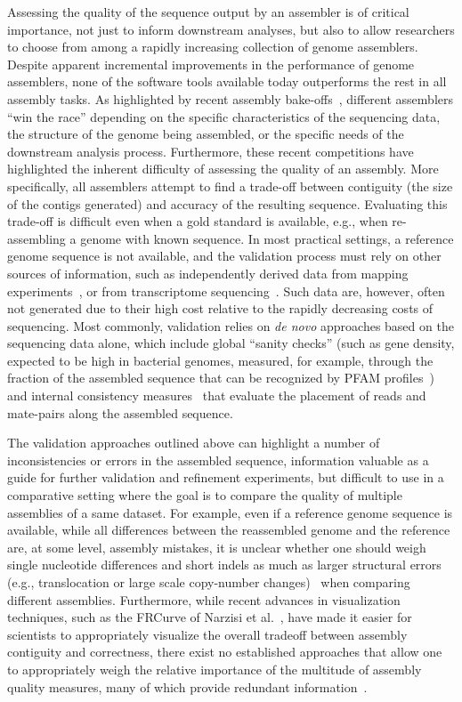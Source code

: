 \documentclass[12pt,\mydriver]{thesis}
\begin{document}
Assessing the quality of the sequence output by an assembler is
of critical importance, not just to inform downstream analyses, but
also to allow researchers to choose from among a rapidly increasing
collection of genome assemblers. Despite apparent incremental
improvements in the performance of genome assemblers, none of the
software tools available today outperforms the rest in all assembly
tasks. As highlighted by recent assembly
bake-offs~\cite{earl2011assemblathon,salzberg2011gage}, different
assemblers ``win the race'' depending on the specific characteristics
of the sequencing data, the structure of the genome being assembled,
or the specific needs of the downstream analysis process.
Furthermore, these recent competitions have highlighted the inherent
difficulty of assessing the quality of an assembly.  More
specifically, all assemblers attempt to find a trade-off between
contiguity (the size of the contigs generated) and accuracy of the
resulting sequence.  Evaluating this trade-off is difficult even when
a gold standard is available, e.g., when re-assembling a genome with
known sequence.  In most practical settings, a reference genome
sequence is not available, and the validation process must rely on
other sources of information, such as independently derived data from
mapping experiments~\cite{zhou2007validation}, or from transcriptome
sequencing~\cite{adamidi2011novo}. Such data are, however, often not
generated due to their high cost relative to the rapidly decreasing
costs of sequencing. Most commonly, validation relies on \emph{de
  novo} approaches based on the sequencing data alone, which include
global ``sanity checks'' (such as gene density, expected to be high in
bacterial genomes, measured, for example, through the fraction of the
assembled sequence that can be recognized by PFAM
profiles~\cite{genovo2011}) and internal consistency
measures~\cite{amosvalidate2008} that evaluate the placement of reads
and mate-pairs along the assembled sequence.

The validation approaches outlined above can highlight a number of
inconsistencies or errors in the assembled sequence, information
valuable as a guide for further validation and refinement experiments,
but difficult to use in a comparative setting where the goal is to
compare the quality of multiple assemblies of a same dataset.  For
example, even if a reference genome sequence is available, while all
differences between the reassembled genome and the reference are, at
some level, assembly mistakes, it is unclear whether one should weigh
single nucleotide differences and short indels as much as larger
structural errors (e.g., translocation or large scale copy-number
changes)~\cite{earl2011assemblathon} when comparing different
assemblies.  Furthermore, while recent advances in visualization
techniques, such as the FRCurve of Narzisi et
al.~\cite{FRC2011,vezzi2012feature}, have made it easier for
scientists to appropriately visualize the overall tradeoff between
assembly contiguity and correctness, there exist no established
approaches that allow one to appropriately weigh
the relative importance of the multitude of assembly quality measures,
many of which provide redundant information~\cite{vezzi2012feature}.
\end{document}
